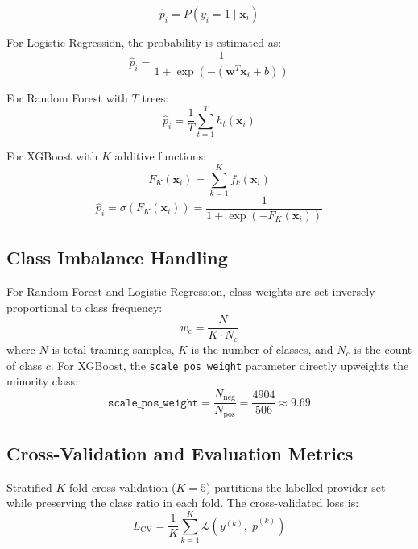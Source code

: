 \begin{equation}
\label{eq:classification}
\hat{p}_i = P(y_i = 1 \mid \mathbf{x}_i)
\end{equation}

For Logistic Regression, the probability is estimated as:
\begin{equation}
\label{eq:logistic}
\hat{p}_i = \frac{1}{1 + \exp\!\left(-(\mathbf{w}^T \mathbf{x}_i + b)\right)}
\end{equation}

For Random Forest with $T$ trees:
\begin{equation}
\label{eq:rf}
\hat{p}_i = \frac{1}{T} \sum_{t=1}^{T} h_t(\mathbf{x}_i)
\end{equation}

For XGBoost with $K$ additive functions:
\begin{equation}
\label{eq:xgb-sum}
F_K(\mathbf{x}_i) = \sum_{k=1}^{K} f_k(\mathbf{x}_i)
\end{equation}
\begin{equation}
\label{eq:xgb-prob}
\hat{p}_i = \sigma(F_K(\mathbf{x}_i)) = \frac{1}{1 + \exp(-F_K(\mathbf{x}_i))}
\end{equation}

\subsection{Class Imbalance Handling}

For Random Forest and Logistic Regression, class weights are set inversely proportional to class frequency:
\begin{equation}
\label{eq:class-weight}
w_c = \frac{N}{K \cdot N_c}
\end{equation}
where $N$ is total training samples, $K$ is the number of classes, and $N_c$ is the count of class $c$. For XGBoost, the \texttt{scale\_pos\_weight} parameter directly upweights the minority class:
\begin{equation}
\label{eq:scale-pos-weight}
\texttt{scale\_pos\_weight} = \frac{N_{\text{neg}}}{N_{\text{pos}}} = \frac{4904}{506} \approx 9.69
\end{equation}

\subsection{Cross-Validation and Evaluation Metrics}

Stratified $K$-fold cross-validation ($K=5$) partitions the labelled provider set while preserving the class ratio in each fold. The cross-validated loss is:
\begin{equation}
\label{eq:cv-loss}
L_{\text{CV}} = \frac{1}{K} \sum_{k=1}^{K} \mathcal{L}\!\left(y^{(k)},\; \hat{p}^{(k)}\right)
\end{equation}


